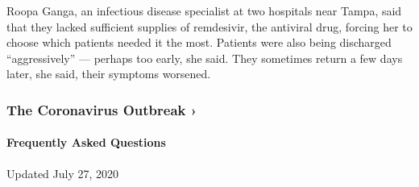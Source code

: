 Roopa Ganga, an infectious disease specialist at two hospitals near
Tampa, said that they lacked sufficient supplies of remdesivir, the
antiviral drug, forcing her to choose which patients needed it the most.
Patients were also being discharged ``aggressively'' --- perhaps too
early, she said. They sometimes return a few days later, she said, their
symptoms worsened.

\href{https://www.nytimes.com/news-event/coronavirus?action=click\&pgtype=Article\&state=default\&region=MAIN_CONTENT_3\&context=storylines_faq}{}

\hypertarget{the-coronavirus-outbreak-}{%
\subsubsection{The Coronavirus Outbreak
›}\label{the-coronavirus-outbreak-}}

\hypertarget{frequently-asked-questions}{%
\paragraph{Frequently Asked
Questions}\label{frequently-asked-questions}}

Updated July 27, 2020

